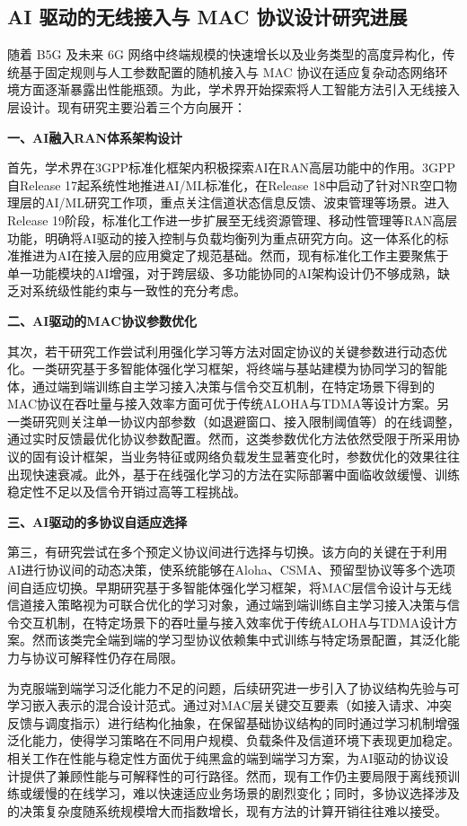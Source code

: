 \subsection{AI 驱动的无线接入与 MAC 协议设计研究进展}

随着 B5G 及未来 6G 网络中终端规模的快速增长以及业务类型的高度异构化，传统基于固定规则与人工参数配置的随机接入与 MAC 协议在适应复杂动态网络环境方面逐渐暴露出性能瓶颈。为此，学术界开始探索将人工智能方法引入无线接入层设计。现有研究主要沿着三个方向展开：

\noindent\textbf{一、AI融入RAN体系架构设计}

首先，学术界在3GPP标准化框架内积极探索AI在RAN高层功能中的作用。3GPP自Release 17起系统性地推进AI/ML标准化，在Release 18中启动了针对NR空口物理层的AI/ML研究工作项，重点关注信道状态信息反馈、波束管理等场景。进入Release 19阶段，标准化工作进一步扩展至无线资源管理、移动性管理等RAN高层功能，明确将AI驱动的接入控制与负载均衡列为重点研究方向。这一体系化的标准推进为AI在接入层的应用奠定了规范基础。然而，现有标准化工作主要聚焦于单一功能模块的AI增强，对于跨层级、多功能协同的AI架构设计仍不够成熟，缺乏对系统级性能约束与一致性的充分考虑。

\noindent\textbf{二、AI驱动的MAC协议参数优化}

其次，若干研究工作尝试利用强化学习等方法对固定协议的关键参数进行动态优化。一类研究基于多智能体强化学习框架，将终端与基站建模为协同学习的智能体，通过端到端训练自主学习接入决策与信令交互机制，在特定场景下得到的MAC协议在吞吐量与接入效率方面可优于传统ALOHA与TDMA等设计方案。另一类研究则关注单一协议内部参数（如退避窗口、接入限制阈值等）的在线调整，通过实时反馈最优化协议参数配置。然而，这类参数优化方法依然受限于所采用协议的固有设计框架，当业务特征或网络负载发生显著变化时，参数优化的效果往往出现快速衰减。此外，基于在线强化学习的方法在实际部署中面临收敛缓慢、训练稳定性不足以及信令开销过高等工程挑战。

\noindent\textbf{三、AI驱动的多协议自适应选择}

第三，有研究尝试在多个预定义协议间进行选择与切换。该方向的关键在于利用AI进行协议间的动态决策，使系统能够在Aloha、CSMA、预留型协议等多个选项间自适应切换。早期研究基于多智能体强化学习框架，将MAC层信令设计与无线信道接入策略视为可联合优化的学习对象，通过端到端训练自主学习接入决策与信令交互机制\cite{2021_AI_ACCESS}，在特定场景下的吞吐量与接入效率优于传统ALOHA与TDMA设计方案。然而该类完全端到端的学习型协议依赖集中式训练与特定场景配置，其泛化能力与协议可解释性仍存在局限。

为克服端到端学习泛化能力不足的问题，后续研究进一步引入了协议结构先验与可学习嵌入表示的混合设计范式\cite{2024_AI_ACCESS2}。通过对MAC层关键交互要素（如接入请求、冲突反馈与调度指示）进行结构化抽象，在保留基础协议结构的同时通过学习机制增强泛化能力，使得学习策略在不同用户规模、负载条件及信道环境下表现更加稳定。相关工作在性能与稳定性方面优于纯黑盒的端到端学习方案，为AI驱动的协议设计提供了兼顾性能与可解释性的可行路径。然而，现有工作仍主要局限于离线预训练或缓慢的在线学习，难以快速适应业务场景的剧烈变化；同时，多协议选择涉及的决策复杂度随系统规模增大而指数增长，现有方法的计算开销往往难以接受。

